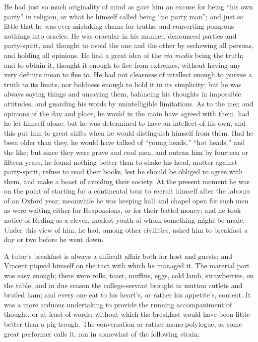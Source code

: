 He had just so much originality of mind as gave him an excuse for
being ``his own party'' in religion, or what he himself called
being ``no party man''; and just so little that he was ever
mistaking shams for truths, and converting pompous nothings into
oracles. He was oracular in his manner, denounced parties and
party-spirit, and thought to avoid the one and the other by eschewing
all persons, and holding all opinions. He had a great idea of the \emph{via
media} being the truth; and to obtain it, thought it enough to flee
from extremes, without having any very definite mean to flee to. He
had not clearness of intellect enough to pursue a truth to its limits,
nor boldness enough to hold it in its simplicity; but he was always
saying things and unsaying them, balancing his thoughts in impossible
attitudes, and guarding his words by unintelligible limitations.
As to the men and opinions of the day and place, he would in the main
have agreed with them, had he let himself alone; but he was determined
to have an intellect of his own, and this put him to great shifts when
he would distinguish himself from them. Had he been older than they,
he would have talked of ``young heads,'' ``hot
heads,'' and the like; but since they were grave and cool men, and
outran him by fourteen or fifteen years, he found nothing better than
to shake his head, mutter against party-spirit, refuse to read their
books, lest he should be obliged to agree with them, and make a boast
of avoiding their society. At the present moment he was on the point
of starting for a continental tour to recruit himself after the
labours of an Oxford year; meanwhile he was keeping hall and chapel
open for such men as were waiting either for Responsions, or for their
battel money; and he took notice of Reding as a clever, modest youth
of whom something might be made. Under this view of him, he had, among
other civilities, asked him to breakfast a day or two before he went
down.

A tutor's breakfast is always a difficult affair both for host and
guests; and Vincent piqued himself on the tact with which he managed
it. The material part was easy enough; there were rolls, toast,
muffins, eggs, cold lamb, strawberries, on the table; and in due
season the college-servant brought in mutton cutlets and broiled ham;
and every one eat to his heart's, or rather his appetite's, content.
It was a more arduous undertaking to provide the running accompaniment
of thought, or at least of words; without which the breakfast
would have been little better than a pig-trough. The conversation or
rather mono-polylogue, as some great performer calls it, ran in
somewhat of the following strain:

